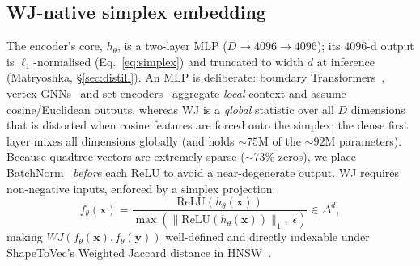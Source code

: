 \documentclass[sigconf]{acmart}
\begin{document}
\subsection{WJ-native simplex embedding}
\label{sec:embed}
The encoder's core, $h_\theta$, is a two-layer MLP ($D\!\to\!4096\!\to\!4096$); its
$4096$-d output is $\ell_1$-normalised (Eq.~\ref{eq:simplex}) and truncated to width
$d$ at inference (Matryoshka, \S\ref{sec:distill}). An MLP is deliberate: boundary Transformers~\cite{mai22}, vertex GNNs~\cite{polygongnn24}
and set encoders~\cite{deepsets17} aggregate \emph{local} context and assume
cosine/Euclidean outputs, whereas WJ is a \emph{global} statistic over all $D$
dimensions that is distorted when cosine features are forced onto the simplex; the
dense first layer mixes all dimensions globally (and holds ${\sim}75$M of the
${\sim}92$M parameters). Because quadtree vectors are extremely sparse
($\sim$73\% zeros), we place BatchNorm~\cite{ioffe15bn} \emph{before} each ReLU to
avoid a near-degenerate output. WJ requires non-negative inputs, enforced by a
simplex projection:
\begin{equation}
  f_\theta(\mathbf{x}) = \frac{\mathrm{ReLU}(h_\theta(\mathbf{x}))}
       {\max(\|\mathrm{ReLU}(h_\theta(\mathbf{x}))\|_1,\;\epsilon)} \in \Delta^{d},
  \label{eq:simplex}
\end{equation}
making $WJ(f_\theta(\mathbf{x}),f_\theta(\mathbf{y}))$ well-defined and directly
indexable under ShapeToVec's Weighted Jaccard distance in HNSW~\cite{shape2vec}.
\end{document}
